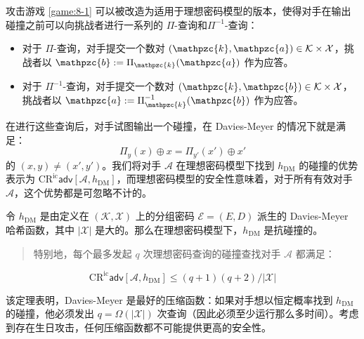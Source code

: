 攻击游戏 \ref{game:8-1} 可以被改造为适用于理想密码模型的版本，使得对手在输出碰撞之前可以向挑战者进行一系列的 $\Pi$-查询和$\Pi^{-1}$-查询：
\begin{itemize}
	\item 对于 $\Pi$-查询，对手提交一个数对 $(\mathpzc{k},\mathpzc{a})\in\mathcal{K}\times\mathcal{X}$，挑战者以 $\mathpzc{b}:=\Pi_\mathpzc{k}(\mathpzc{a})$ 作为应答。
	\item 对于 $\Pi^{-1}$-查询，对手提交一个数对 $(\mathpzc{k},\mathpzc{b})\in\mathcal{K}\times\mathcal{X}$，挑战者以 $\mathpzc{a}:=\Pi_\mathpzc{k}^{-1}(\mathpzc{b})$ 作为应答。
\end{itemize}
在进行这些查询后，对手试图输出一个碰撞，在 Davies-Meyer 的情况下就是满足：
\[
\Pi_y(x)\oplus x=\Pi_{y'}(x')\oplus x'
\]
的 $(x,y)\neq(x',y')$。我们将对手 $\mathcal{A}$ 在理想密码模型下找到 $h_\mathrm{DM}$ 的碰撞的优势表示为 $\mathrm{CR}^\mathrm{ic}\mathsf{adv}[\mathcal{A},h_\mathrm{DM}]$，而理想密码模型的安全性意味着，对于所有有效对手 $\mathcal{A}$，这个优势都是可忽略不计的。

\begin{theorem}\label{theo:8-4}
令 $h_\mathrm{DM}$ 是由定义在 $(\mathcal{K},\mathcal{X})$ 上的分组密码 $\mathcal{E}=(E,D)$ 派生的 Davies-Meyer 哈希函数，其中 $|\mathcal{X}|$ 是大的。那么在理想密码模型下，$h_\mathrm{DM}$ 是抗碰撞的。
\begin{quote}
特别地，每个最多发起 $q$ 次理想密码查询的碰撞查找对手 $\mathcal{A}$ 都满足：
\end{quote}
\[
\mathrm{CR}^\mathrm{ic}\mathsf{adv}[\mathcal{A},h_\mathrm{DM}]
\leq
(q+1)(q+2)/|\mathcal{X}|
\]
\end{theorem}

该定理表明，Davies-Meyer 是最好的压缩函数：如果对手想以恒定概率找到 $h_\mathrm{DM}$ 的碰撞，他必须发出 $q=\Omega(|\mathcal{X}|)$ 次查询（因此必须至少运行那么多时间）。考虑到存在生日攻击，任何压缩函数都不可能提供更高的安全性。

